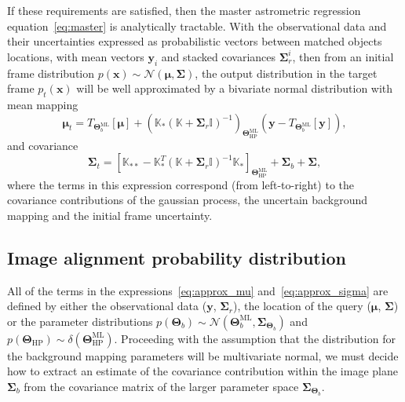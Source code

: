 \documentclass[manuscript]{aastex}
\newcommand{\bsmu}{\boldsymbol\mu}
\newcommand{\bsS}{\boldsymbol\Sigma}
\newcommand{\bsT}{\boldsymbol\Theta}
\begin{document}
If these requirements are satisfied, then the master astrometric regression equation~\eqref{eq:master} is analytically tractable. With the observational data and their uncertainties expressed as probabilistic vectors between matched objects locations, with mean vectors $\mathbf{y}_i$ and stacked covariances $\bsS_r^i$, then from an initial frame distribution $p(\mathbf{x})\sim\mathcal{N}(\bsmu,\bsS)$, the output distribution in the target frame $p_t(\mathbf{x})$ will be well approximated by a bivariate normal distribution with mean mapping 
\begin{equation}
\bsmu_t = T_{\bsT_b^\mathrm{ML}}\left[\bsmu\right]+\left(\mathbb{K}_\ast (\mathbb{K}+\bsS_r\mathbb{I})^{-1}\right)_{\bsT_\mathrm{HP}^\mathrm{ML}}\left(\mathbf{y} - T_{\bsT_b^\mathrm{ML}}\left[\mathbf{y}\right]\right),\label{eq:approx_mu}
\end{equation}
and covariance
\begin{equation}
\bsS_t = \left[\mathbb{K}_{\ast\ast} - \mathbb{K}_\ast^T (\mathbb{K}+\bsS_r\mathbb{I})^{-1} \mathbb{K}_\ast\right]_{\bsT_\mathrm{HP}^\mathrm{ML}} + \bsS_b + \bsS,\label{eq:approx_sigma}
\end{equation}
where the terms in this expression correspond (from left-to-right) to the covariance contributions of the gaussian process, the uncertain background mapping and the initial frame uncertainty.

\subsection{Image alignment probability distribution}
All of the terms in the expressions~\eqref{eq:approx_mu} and~\eqref{eq:approx_sigma} are defined by either the observational data ($\mathbf{y}$, $\bsS_r$), the location of the query ($\bsmu$, $\bsS$) or the parameter distributions $p(\bsT_b)\sim\mathcal{N}(\bsT_b^\mathrm{ML},\bsS_{\bsT_b})$ and $p(\bsT_\mathrm{HP})\sim\delta(\bsT_\mathrm{HP}^\mathrm{ML})$. Proceeding with the assumption that the distribution for the background mapping parameters will be multivariate normal, we must decide how to extract an estimate of the covariance contribution within the image plane $\bsS_b$ from the covariance matrix of the larger parameter space $\bsS_{\bsT_b}$.
\end{document}
